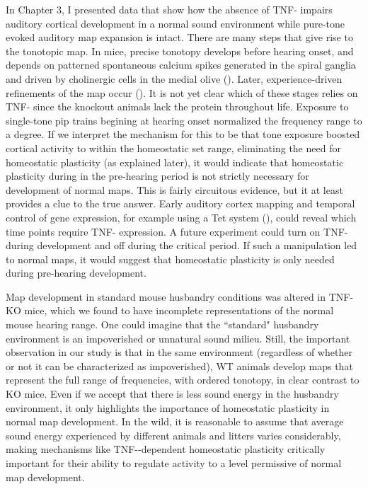 In Chapter 3, I presented data that show how the absence of TNF-\textalpha{} impairs auditory cortical development in a normal sound environment while pure-tone evoked auditory map expansion is intact. There are many steps that give rise to the tonotopic map. In mice, precise tonotopy develops before hearing onset, and depends on patterned spontaneous calcium spikes generated in the spiral ganglia and driven by cholinergic cells in the medial olive (\cite{Elgoyhen1994, Cao2008, Clause2014}). Later, experience-driven refinements of the map occur (\cite{DeVillers-Sidani2008, Han2007}). It is not yet clear which of these stages relies on TNF-\textalpha{} since the knockout animals lack the protein throughout life. Exposure to single-tone pip trains begining at hearing onset normalized the frequency range to a degree. If we interpret the mechanism for this to be that tone exposure boosted cortical activity to within the homeostatic set range, eliminating the need for homeostatic plasticity (as explained later), it would indicate that  homeostatic plasticity during in the pre-hearing period is not strictly necessary for development of normal maps. This is fairly circuitous evidence, but it at least provides a clue to the true answer. Early auditory cortex mapping and temporal control of gene expression, for example using a Tet system (\cite{Gossen1995}), could reveal which time points require TNF-\textalpha{} expression. A future experiment could turn on TNF-\textalpha{} during development and off during the critical period. If such a manipulation led to normal maps, it would suggest that homeostatic plasticity is only needed during pre-hearing development.

Map development in standard mouse husbandry conditions was altered in TNF-\textalpha{} KO mice, which we found to have incomplete representations of the normal mouse hearing range. One could imagine that the ``standard" husbandry environment is an impoverished or unnatural sound milieu. Still, the important observation in our study is that in the same environment (regardless of whether or not it can be characterized as impoverished), WT animals develop maps that represent the full range of frequencies, with ordered tonotopy, in clear contrast to KO mice. Even if we accept that there is less sound energy in the husbandry environment, it only highlights the importance of homeostatic plasticity in normal map development. In the wild, it is reasonable to assume that average sound energy experienced by different animals and litters varies considerably, making mechanisms like TNF-\textalpha{}-dependent homeostatic plasticity critically important for their ability to regulate activity to a level permissive of normal map development.

